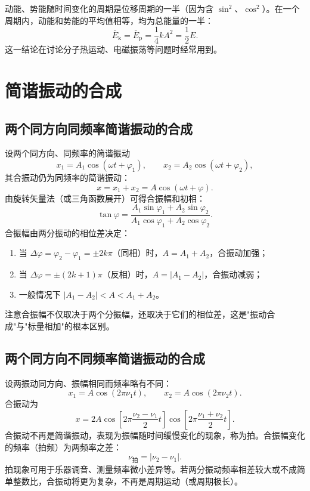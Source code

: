     动能、势能随时间变化的周期是位移周期的一半（因为含 $\sin^{2}$、$\cos^{2}$）。在一个周期内，动能和势能的平均值相等，均为总能量的一半：
    \[
    \bar{E}_\mathrm{k}=\bar{E}_\mathrm{p}=\frac{1}{4}kA^{2}=\frac{1}{2}E.
    \]
    这一结论在讨论分子热运动、电磁振荡等问题时经常用到。


\section{简谐振动的合成}
    \subsection{两个同方向同频率简谐振动的合成}
    设两个同方向、同频率的简谐振动
    \[
    x_1=A_1\cos(\omega t+\varphi_1),\qquad x_2=A_2\cos(\omega t+\varphi_2),
    \]
    其合振动仍为同频率的简谐振动：
    \[
    x=x_1+x_2=A\cos(\omega t+\varphi).
    \]
    由旋转矢量法（或三角函数展开）可得合振幅和初相：
    \[
    \tan\varphi=\frac{A_1\sin\varphi_1+A_2\sin\varphi_2}{A_1\cos\varphi_1+A_2\cos\varphi_2}.
    \]
    合振幅由两分振动的相位差决定：
    \begin{enumerate}
        \item 当 $\Delta\varphi=\varphi_2-\varphi_1=\pm2k\pi$（同相）时，$A=A_1+A_2$，合振动加强；
        \item 当 $\Delta\varphi=\pm(2k+1)\pi$（反相）时，$A=|A_1-A_2|$，合振动减弱；
        \item 一般情况下 $|A_1-A_2|<A<A_1+A_2$。
    \end{enumerate}
    注意合振幅不仅取决于两个分振幅，还取决于它们的相位差，这是"振动合成"与"标量相加"的根本区别。

    \subsection{两个同方向不同频率简谐振动的合成}
    设两振动同方向、振幅相同而频率略有不同：
    \[
    x_1=A\cos(2\pi\nu_1t),\qquad x_2=A\cos(2\pi\nu_2t).
    \]
    合振动为
    \[
    x=2A\cos\left[2\pi\frac{\nu_2-\nu_1}{2}t\right]\cos\left[2\pi\frac{\nu_1+\nu_2}{2}t\right].
    \]
    合振动不再是简谐振动，表现为振幅随时间缓慢变化的现象，称为拍。合振幅变化的频率（拍频）为两频率之差：
    \[
    \nu_{\text{拍}}=|\nu_2-\nu_1|.
    \]
    拍现象可用于乐器调音、测量频率微小差异等。若两分振动频率相差较大或不成简单整数比，合振动将更为复杂，不再是周期运动（或周期极长）。

